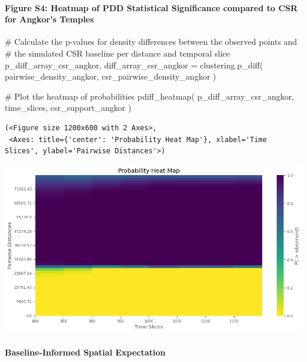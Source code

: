 \documentclass[
  11pt,
  letterpaper,
  DIV=11,
  numbers=noendperiod]{scrartcl}
\let\oldparagraph\paragraph
\renewcommand{\paragraph}[1]{\oldparagraph{#1}\mbox{}}
\newenvironment{Shaded}{\begin{snugshade}}{\end{snugshade}}
\newcommand{\CommentTok}[1]{\textcolor[rgb]{0.37,0.37,0.37}{#1}}
\newcommand{\NormalTok}[1]{\textcolor[rgb]{0.00,0.23,0.31}{#1}}
\newcommand{\OperatorTok}[1]{\textcolor[rgb]{0.37,0.37,0.37}{#1}}
\begin{document}
\paragraph{Figure S4: Heatmap of PDD Statistical Significance compared
to CSR for Angkor's
Temples}\label{figure-s4-heatmap-of-pdd-statistical-significance-compared-to-csr-for-angkors-temples}

\begin{Shaded}
\begin{Highlighting}[]
\CommentTok{\# Calculate the p{-}values for density differences between the observed points and }
\CommentTok{\# the simulated CSR baseline per distance and temporal slice}
\NormalTok{p\_diff\_array\_csr\_angkor, diff\_array\_csr\_angkor }\OperatorTok{=}\NormalTok{ clustering.p\_diff(}
\NormalTok{    pairwise\_density\_angkor, }
\NormalTok{    csr\_pairwise\_density\_angkor}
\NormalTok{)}

\CommentTok{\# Plot the heatmap of probabilities}
\NormalTok{pdiff\_heatmap(}
\NormalTok{    p\_diff\_array\_csr\_angkor,}
\NormalTok{    time\_slices,}
\NormalTok{    csr\_support\_angkor}
\NormalTok{)}
\end{Highlighting}
\end{Shaded}

\begin{verbatim}
(<Figure size 1200x600 with 2 Axes>,
 <Axes: title={'center': 'Probability Heat Map'}, xlabel='Time Slices', ylabel='Pairwise Distances'>)
\end{verbatim}

\includegraphics{analysis_files/figure-pdf/cell-12-output-2.png}

\paragraph{Baseline-Informed Spatial
Expectation}\label{baseline-informed-spatial-expectation}
\end{document}
